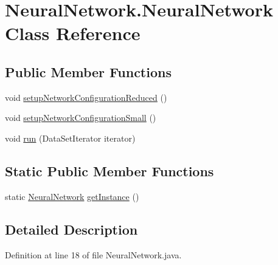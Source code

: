 \hypertarget{class_neural_network_1_1_neural_network}{\section{Neural\-Network.\-Neural\-Network Class Reference}
\label{class_neural_network_1_1_neural_network}
}
\subsection*{Public Member Functions}
\begin{DoxyCompactItemize}
\item 
void \hyperlink{class_neural_network_1_1_neural_network_ab78cfc2ca78f23dd21b07082a2a73bf6}{setup\-Network\-Configuration\-Reduced} ()
\item 
void \hyperlink{class_neural_network_1_1_neural_network_a06ad59af1ef9b750a0b54c9e242b66d9}{setup\-Network\-Configuration\-Small} ()
\item 
void \hyperlink{class_neural_network_1_1_neural_network_aca5ac7917bb1f2f9f8c32b60eb4efd1b}{run} (Data\-Set\-Iterator iterator)
\end{DoxyCompactItemize}
\subsection*{Static Public Member Functions}
\begin{DoxyCompactItemize}
\item 
static \hyperlink{class_neural_network_1_1_neural_network}{Neural\-Network} \hyperlink{class_neural_network_1_1_neural_network_a3644b86f84197b1acd2660e63f0b4da3}{get\-Instance} ()
\end{DoxyCompactItemize}


\subsection{Detailed Description}


Definition at line 18 of file Neural\-Network.\-java.



